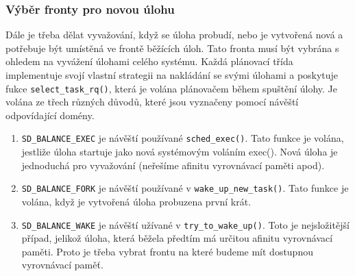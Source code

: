 \documentclass[a4paper,12pt]{article}
\begin{document}
%
%
%
%
%
%
%
%


\subsubsection{Výběr fronty pro novou úlohu}

Dále je třeba dělat vyvažování, když se úloha probudí, nebo je vytvořená nová a potřebuje být umístěná ve frontě běžících úloh. Tato fronta musí být vybrána s ohledem na vyvážení úlohami celého systému. Každá plánovací třída implementuje svojí vlastní strategii na nakládání se svými úlohami a poskytuje fukce \verb#select_task_rq()#, která je volána plánovačem během spuštění úlohy. Je volána ze třech různých důvodů, které jsou vyznačeny pomocí návěští odpovídající domény.

\begin{enumerate}

\item \verb#SD_BALANCE_EXEC# je návěští používané \verb#sched_exec()#. Tato funkce je volána, jestliže úloha startuje jako nová systémovým voláním exec(). Nová úloha je jednoduchá pro vyvažování (neřešíme afinitu vyrovnávací paměti apod).
\item \verb#SD_BALANCE_FORK# je návěští používané v \verb#wake_up_new_task()#. Tato funkce je volána, když je vytvořená úloha probuzena první krát.
\item \verb#SD_BALANCE_WAKE# je návěští užívané v \verb#try_to_wake_up()#. Toto je nejsložitější případ, jelikož úloha, která běžela předtím má určitou afinitu vyrovnávací paměti. Proto je třeba vybrat frontu na které budeme mít dostupnou vyrovnávací paměť.

\end{enumerate}
\end{document}
